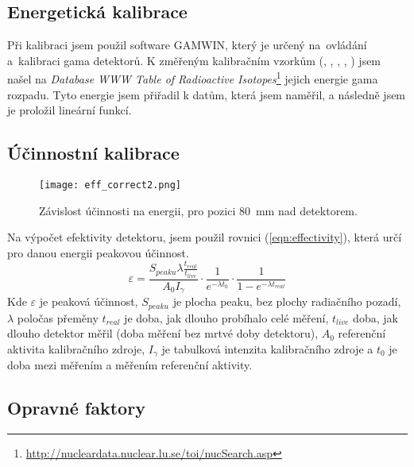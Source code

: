 \subsection{Energetická kalibrace}%
Při kalibraci jsem použil software GAMWIN, který je určený na~ovládání a~kalibraci gama detektorů. K změřeným kalibračním vzorkům (, , , , ) jsem našel na \textit{Database WWW Table of Radioactive Isotopes}\footnote{\url{http://nucleardata.nuclear.lu.se/toi/nucSearch.asp}}
jejich energie gama rozpadu. Tyto energie jsem přiřadil k datům, která jsem naměřil, a následně jsem je proložil lineární funkcí. \cite{VUT} 

\subsection{Účinnostní kalibrace}
\begin{figure}[h!]
	\renewcommand\figurename{Graf}
	\centering
	\texttt{[image: eff\_correct2.png]}%
	\caption{Závislost účinnosti na energii, pro pozici \SI{80}{\milli\metre} nad detektorem.}
	\label{fig:EFFvsENG5mm}
\end{figure}
Na výpočet efektivity detektoru, jsem použil rovnici  (\ref{eqn:effectivity}), která určí pro danou energii peakovou účinnost.
\begin{equation}
	\label{eqn:effectivity}
	\varepsilon = \frac{S_{peaku}\lambda\frac{t_{real}}{t_{live}}}{A_0 I_\gamma}\cdot\frac{1}{e^{-\lambda t_0}}\cdot\frac{1}{1-e^{-\lambda t_{real}}}
\end{equation}
Kde $\varepsilon$ je peaková účinnost, $S_{peaku}$ je plocha peaku, bez plochy radiačního pozadí, $\lambda$ poločas přeměny  $t_{real}$ je doba, jak dlouho probíhalo celé měření, $t_{live}$ doba, jak dlouho detektor měřil (doba měření bez mrtvé doby detektoru), $A_0$ referenční aktivita kalibračního zdroje,  $I_\gamma$ je tabulková intenzita kalibračního zdroje a $t_0$ je doba mezi měřením a měřením referenční aktivity.
\subsection{Opravné faktory}
